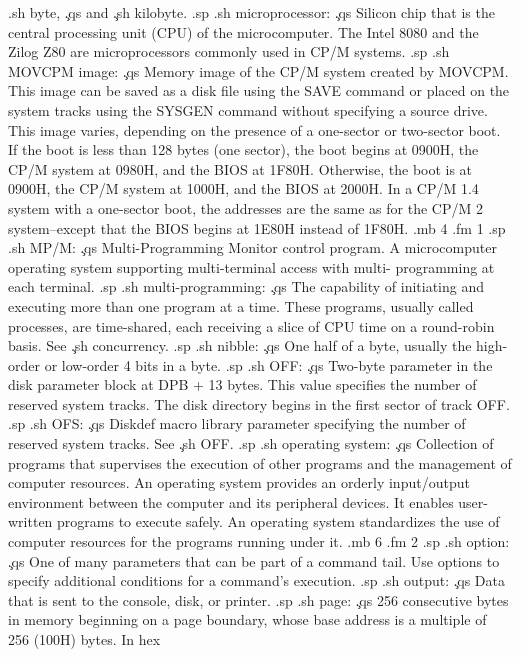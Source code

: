 .sh
byte, \c
.qs
and \c
.sh
kilobyte.
.sp
.sh
microprocessor:  \c
.qs
Silicon chip that is the central processing unit (CPU) of the 
microcomputer.  The Intel 8080 and the Zilog Z80 are 
microprocessors commonly used in CP/M systems.
.sp
.sh
MOVCPM image:  \c
.qs
Memory image of the CP/M system created by MOVCPM.  This image 
can be saved as a disk file using the SAVE command or placed on 
the system tracks using the SYSGEN command without specifying a 
source drive.  This image varies, depending on the presence of a 
one-sector or two-sector boot.  If the boot is less than 128 
bytes (one sector), the boot begins at 0900H, the CP/M system at 
0980H, and the BIOS at 1F80H.  Otherwise, the boot is at 0900H, 
the CP/M system at 1000H, and the BIOS at 2000H.  In a CP/M 1.4 
system with a one-sector boot, the addresses are the same as for 
the CP/M 2 system--except that the BIOS begins at 1E80H instead 
of 1F80H.
.mb 4
.fm 1
.sp
.sh
MP/M:  \c
.qs
Multi-Programming Monitor control program.  A microcomputer 
operating system supporting multi-terminal access with multi-
programming at each terminal.
.sp
.sh
multi-programming:  \c
.qs
The capability of initiating and executing more than one program 
at a time.  These programs, usually called processes, are time-shared, 
each receiving a slice of CPU time on a round-robin 
basis.  See \c
.sh
concurrency.
.sp
.sh
nibble:  \c
.qs
One half of a byte, usually the high-order or low-order 4 bits in 
a byte.  
.sp
.sh
OFF:  \c
.qs
Two-byte parameter in the disk parameter block at DPB + 13 bytes.  
This value specifies the number of reserved system tracks.  The 
disk directory begins in the first sector of track OFF.
.sp
.sh
OFS:  \c
.qs
Diskdef macro library parameter specifying the number of reserved 
system tracks.  See \c
.sh
OFF.
.sp
.sh
operating system:  \c
.qs
Collection of programs that supervises the execution of other 
programs and the management of computer resources.  An operating 
system provides an orderly input/output environment between the 
computer and its peripheral devices.  It enables user-written 
programs to execute safely.  An operating system standardizes the 
use of computer resources for the programs running under it.
.mb 6
.fm 2
.sp
.sh
option:  \c
.qs
One of many parameters that can be part of a command tail.  Use 
options to specify additional conditions for a command's 
execution.
.sp
.sh
output:  \c
.qs
Data that is sent to the console, disk, or printer.
.sp
.sh
page:  \c
.qs
256 consecutive bytes in memory beginning on a page boundary, 
whose base address is a multiple of 256 (100H) bytes.  In hex 

